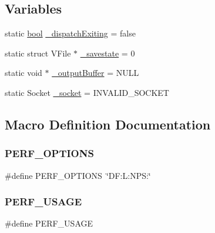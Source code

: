 \subsection*{Variables}
\begin{DoxyCompactItemize}
\item 
static \mbox{\hyperlink{libretro_8h_a4a26dcae73fb7e1528214a068aca317e}{bool}} \mbox{\hyperlink{perf-main_8c_a8525f6cde5f9256308f54df6d5b5ba37}{\+\_\+dispatch\+Exiting}} = false
\item 
static struct V\+File $\ast$ \mbox{\hyperlink{perf-main_8c_ac52719ecba19b2c4ce86134edcdcea35}{\+\_\+savestate}} = 0
\item 
static void $\ast$ \mbox{\hyperlink{perf-main_8c_a208165c3b883d1557b33cce53e251cb2}{\+\_\+output\+Buffer}} = N\+U\+LL
\item 
static Socket \mbox{\hyperlink{perf-main_8c_a19c179c3753ee778675a7eb82548f554}{\+\_\+socket}} = I\+N\+V\+A\+L\+I\+D\+\_\+\+S\+O\+C\+K\+ET
\end{DoxyCompactItemize}


\subsection{Macro Definition Documentation}
\mbox{\label{perf-main_8c_a10b7b15dd56a2e448bb115bca3c138ea}} 
\subsubsection{\texorpdfstring{P\+E\+R\+F\+\_\+\+O\+P\+T\+I\+O\+NS}{PERF\_OPTIONS}}
{\footnotesize\ttfamily \#define P\+E\+R\+F\+\_\+\+O\+P\+T\+I\+O\+NS~\char`\"{}D\+F\+:\+L\+:\+N\+P\+S\+:\char`\"{}}

\mbox{\label{perf-main_8c_a397e50d8fab523d6a3f5ed6adeff6d40}} 
\subsubsection{\texorpdfstring{P\+E\+R\+F\+\_\+\+U\+S\+A\+GE}{PERF\_USAGE}}
{\footnotesize\ttfamily \#define P\+E\+R\+F\+\_\+\+U\+S\+A\+GE}

